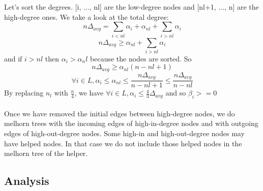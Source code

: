 \documentclass{article}
\begin{document}
Let's sort the degrees. [i, ..., nl] are the low-degree nodes and
[nl+1, ..., n] are the high-degree ones. We take a look at the total degree:
$$n\Delta_{avg} = \sum_{i < nl} \alpha_i + \alpha_{nl} + \sum_{i > nl} \alpha_i$$
$$n\Delta_{avg} \geq \alpha_{nl} + \sum_{i > nl} \alpha_i$$
and if $i > nl$ then $\alpha_i > \alpha_nl$ because the nodes are sorted. So
$$n\Delta_{avg} \geq \alpha_{nl}(n-nl+1)$$
$$\forall i \in L, \alpha_i \leq \alpha_{nl} \leq \frac{n\Delta_{avg}}{n-nl+1} \leq \frac{n\Delta_{avg}}{n-nl}$$
By replacing $n_l$ with $\frac{n}{4}$, we have
$\forall i \in L, \alpha_i \leq \frac{4}{3}\Delta_{avg}$ and so $\beta_i >= 0$\\\\
Once we have removed the initial edges between high-degree nodes,
we do melhorn trees with the incoming edges of high-in-degree
nodes and with outgoing edges of high-out-degree nodes.
Some high-in and high-out-degree nodes may have helped nodes.
In that case we do not include those helped nodes in the melhorn tree of the helper.

\subsection{Analysis}
\end{document}
